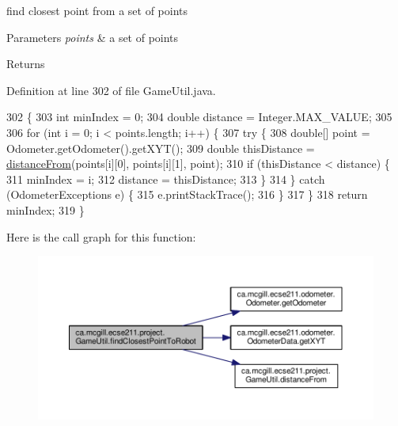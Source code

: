 find closest point from a set of points


\begin{DoxyParams}{Parameters}
{\em points} & a set of points \\
\hline
\end{DoxyParams}
\begin{DoxyReturn}{Returns}

\end{DoxyReturn}


Definition at line 302 of file Game\+Util.\+java.


\begin{DoxyCode}
302                                                             \{
303     \textcolor{keywordtype}{int} minIndex = 0;
304     \textcolor{keywordtype}{double} distance = Integer.MAX\_VALUE;
305 
306     \textcolor{keywordflow}{for} (\textcolor{keywordtype}{int} i = 0; i < points.length; i++) \{
307       \textcolor{keywordflow}{try} \{
308         \textcolor{keywordtype}{double}[] point = Odometer.getOdometer().getXYT();
309         \textcolor{keywordtype}{double} thisDistance = \hyperlink{classca_1_1mcgill_1_1ecse211_1_1project_1_1_game_util_a6fb324a3d5e42414c83dfd8bd5910b56}{distanceFrom}(points[i][0], points[i][1], point);
310         \textcolor{keywordflow}{if} (thisDistance < distance) \{
311           minIndex = i;
312           distance = thisDistance;
313         \}
314       \} \textcolor{keywordflow}{catch} (OdometerExceptions e) \{
315         e.printStackTrace();
316       \}
317     \}
318     \textcolor{keywordflow}{return} minIndex;
319   \}
\end{DoxyCode}
Here is the call graph for this function\+:\nopagebreak
\begin{figure}[H]
\begin{center}
\leavevmode
\includegraphics[width=350pt]{classca_1_1mcgill_1_1ecse211_1_1project_1_1_game_util_a6e0ee94b800ca3727ca8009782abda14_cgraph}
\end{center}
\end{figure}
